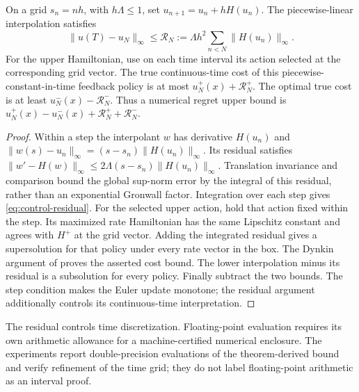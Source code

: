 \begin{proposition}\label{prop:control-residual}
On a grid $s_n=nh$, with $h\Lambda\le1$, set $u_{n+1}=u_n+hH(u_n)$. The piecewise-linear interpolation satisfies
\begin{equation}\label{eq:control-residual}
 \|u(T)-u_N\|_\infty
 \le\mathcal R_N:=\Lambda h^2\sum_{n<N}\|H(u_n)\|_\infty.
\end{equation}
For the upper Hamiltonian, use on each time interval its action selected at the corresponding grid vector. The true continuous-time cost of this piecewise-constant-in-time feedback policy is at most $u_N^+(x)+\mathcal R_N^+$. The optimal true cost is at least $u_N^-(x)-\mathcal R_N^-$. Thus a numerical regret upper bound is
$u_N^+(x)-u_N^-(x)+\mathcal R_N^++\mathcal R_N^-$.
\end{proposition}
\begin{proof}
Within a step the interpolant $w$ has derivative $H(u_n)$ and
$\|w(s)-u_n\|_\infty=(s-s_n)\|H(u_n)\|_\infty$.
Its residual satisfies
$\|w'-H(w)\|_\infty\le2\Lambda(s-s_n)\|H(u_n)\|_\infty$.
Translation invariance and comparison bound the global sup-norm error by the integral of this residual, rather than an exponential Gronwall factor. Integration over each step gives \eqref{eq:control-residual}. For the selected upper action, hold that action fixed within the step. Its maximized rate Hamiltonian has the same Lipschitz constant and agrees with $H^+$ at the grid vector. Adding the integrated residual gives a supersolution for that policy under every rate vector in the box. The Dynkin argument of  proves the asserted cost bound. The lower interpolation minus its residual is a subsolution for every policy. Finally subtract the two bounds. The step condition makes the Euler update monotone; the residual argument additionally controls its continuous-time interpretation.
\end{proof}

The residual controls time discretization. Floating-point evaluation requires its own arithmetic allowance for a machine-certified numerical enclosure. The experiments report double-precision evaluations of the theorem-derived bound and verify refinement of the time grid; they do not label floating-point arithmetic as an interval proof.
